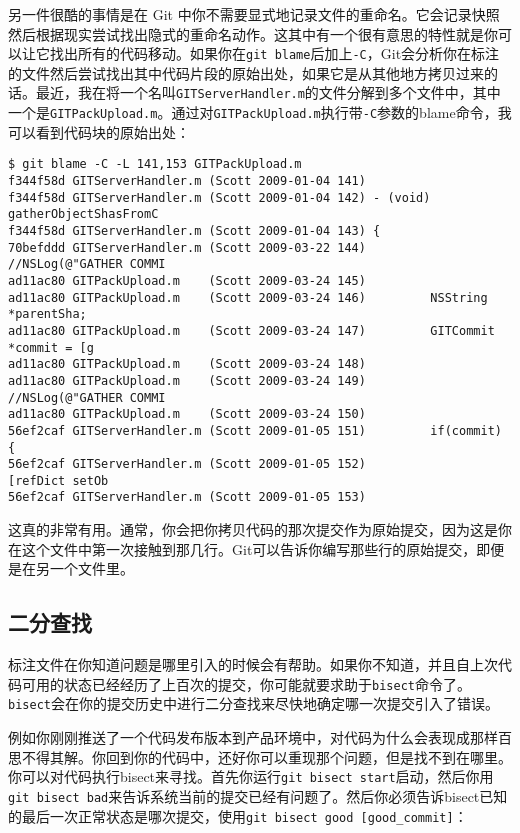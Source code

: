 \documentclass[a4paper]{book}
\begin{document}
另一件很酷的事情是在 Git 中你不需要显式地记录文件的重命名。它会记录快照然后根据现实尝试找出隐式的重命名动作。这其中有一个很有意思的特性就是你可以让它找出所有的代码移动。如果你在\texttt{git blame}后加上\texttt{-C}，Git会分析你在标注的文件然后尝试找出其中代码片段的原始出处，如果它是从其他地方拷贝过来的话。最近，我在将一个名叫\texttt{GITServerHandler.m}的文件分解到多个文件中，其中一个是\texttt{GITPackUpload.m}。通过对\texttt{GITPackUpload.m}执行带\texttt{-C}参数的blame命令，我可以看到代码块的原始出处：

\begin{shaded}\begin{verbatim}
$ git blame -C -L 141,153 GITPackUpload.m 
f344f58d GITServerHandler.m (Scott 2009-01-04 141) 
f344f58d GITServerHandler.m (Scott 2009-01-04 142) - (void) gatherObjectShasFromC
f344f58d GITServerHandler.m (Scott 2009-01-04 143) {
70befddd GITServerHandler.m (Scott 2009-03-22 144)         //NSLog(@"GATHER COMMI
ad11ac80 GITPackUpload.m    (Scott 2009-03-24 145)
ad11ac80 GITPackUpload.m    (Scott 2009-03-24 146)         NSString *parentSha;
ad11ac80 GITPackUpload.m    (Scott 2009-03-24 147)         GITCommit *commit = [g
ad11ac80 GITPackUpload.m    (Scott 2009-03-24 148)
ad11ac80 GITPackUpload.m    (Scott 2009-03-24 149)         //NSLog(@"GATHER COMMI
ad11ac80 GITPackUpload.m    (Scott 2009-03-24 150)
56ef2caf GITServerHandler.m (Scott 2009-01-05 151)         if(commit) {
56ef2caf GITServerHandler.m (Scott 2009-01-05 152)                 [refDict setOb
56ef2caf GITServerHandler.m (Scott 2009-01-05 153)
\end{verbatim}\end{shaded}

这真的非常有用。通常，你会把你拷贝代码的那次提交作为原始提交，因为这是你在这个文件中第一次接触到那几行。Git可以告诉你编写那些行的原始提交，即便是在另一个文件里。

\subsection{二分查找}

标注文件在你知道问题是哪里引入的时候会有帮助。如果你不知道，并且自上次代码可用的状态已经经历了上百次的提交，你可能就要求助于\texttt{bisect}命令了。\texttt{bisect}会在你的提交历史中进行二分查找来尽快地确定哪一次提交引入了错误。

例如你刚刚推送了一个代码发布版本到产品环境中，对代码为什么会表现成那样百思不得其解。你回到你的代码中，还好你可以重现那个问题，但是找不到在哪里。你可以对代码执行bisect来寻找。首先你运行\texttt{git bisect start}启动，然后你用\texttt{git bisect bad}来告诉系统当前的提交已经有问题了。然后你必须告诉bisect已知的最后一次正常状态是哪次提交，使用\texttt{git bisect good {[}good\_commit{]}}：
\end{document}
